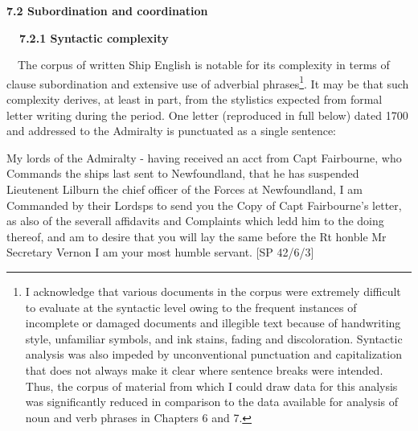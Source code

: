 \begin{styleStandard}
\textbf{7.2 Subordination and coordination}
\end{styleStandard}

\begin{styleStandard}
\textbf{\ \ 7.2.1 Syntactic complexity}
\end{styleStandard}

\begin{styleStandard}
\ \ The corpus of written Ship English is notable for its complexity in terms of clause subordination and extensive use of adverbial phrases\footnote{ I acknowledge that various documents in the corpus were\textbf{ }extremely difficult to evaluate at the syntactic level owing to the frequent instances of incomplete or damaged documents and illegible text because of handwriting style, unfamiliar symbols, and ink stains, fading and discoloration. Syntactic analysis was also impeded by unconventional punctuation and capitalization that does not always make it clear where sentence breaks were intended. Thus, the corpus of material from which I could draw data for this analysis was significantly reduced in comparison to the data available for analysis of noun and verb phrases in Chapters 6 and 7. }. It may be that such complexity derives, at least in part, from the stylistics expected from formal letter writing during the period. One letter (reproduced in full below) dated 1700 and addressed to the Admiralty is punctuated as a single sentence: 
\end{styleStandard}

\begin{styleStandard}
My lords of the Admiralty - having received an acct from Capt Fairbourne, who Commands the ships last sent to Newfoundland, that he has suspended Lieutenent Lilburn the chief officer of the Forces at Newfoundland, I am Commanded by their Lordsps to send you the Copy of Capt Fairbourne’s letter, as also of the severall affidavits and Complaints which ledd him to the doing thereof, and am to desire that you will lay the same before the Rt honble Mr Secretary Vernon I am your most humble servant. [SP 42/6/3] 
\end{styleStandard}

